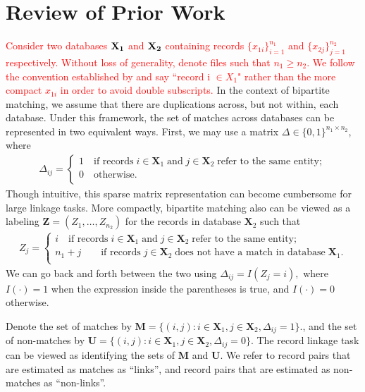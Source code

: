 \documentclass[ba]{imsart}
\begin{document}
\section{Review of Prior Work}
\label{sec:review-of_prior-work}

\textcolor{red}{Consider two databases $\bf{X}_1$ and $\bf{X}_2$ containing records $\{x_{1i}\}_{i=1}^{n_1}$ and $\{x_{2j}\}_{j=1}^{n_2}$ respectively. Without loss of generality, denote files such that $n_1 \geq n_2$. We follow the convention established by \cite{sadinle_bayesian_2017} and say ``record i $\in X_1$" rather than the more compact $x_{1i}$ in order to avoid double subscripts.} In the context of bipartite matching, we assume that there are duplications across, but not within, each database. Under this framework, the set of matches across databases can be represented in two equivalent ways. First, we may use a matrix $\Delta \in \{0, 1\}^{n_1 \times n_2}$, where
\begin{align}
	\Delta_{ij} =
	\begin{cases}
		1 \quad \text{if records}\;  i \in \bm{X}_1 \; \text{and}\; j\in \bm{X}_2 \; \text{refer to the same entity}; \\
		0 \quad \text{otherwise}.\\
	\end{cases}
\end{align}
Though intuitive, this sparse matrix representation can become cumbersome for large linkage tasks. More compactly, bipartite matching also can be viewed as a labeling $\bm{Z} = (Z_1, \ldots, Z_{n_2})$ for the records in database $\bm{X}_2$ such that 
\begin{align}
	Z_{j} =
	\begin{cases}
		i \quad \text{if records}\;  i \in \bm{X}_1 \; \text{and}\; j\in \bm{X}_2 \; \text{refer to the same entity}; \\
		n_1 + j \quad  \quad \text{if records}\;  j \in \bm{X}_2 \; \text{does not have a match in database}\; \bm{X}_1. \\
	\end{cases}
\end{align}
We can go back and forth between the two using $\Delta_{ij} = I(Z_j = i),$ where $I(\cdot) = 1$ when the expression inside the parentheses is true, and $I(\cdot) = 0$ otherwise. 

Denote the set of matches by $\bm{M} = \{(i,j): i \in \bm{X}_1, j \in \bm{X}_2, \Delta_{ij} = 1\}.$, and the set of non-matches by 
$\bm{U} =  \{(i,j): i \in \bm{X}_1, j \in \bm{X}_2, \Delta_{ij} = 0\}.$ The record linkage task can be viewed as identifying the sets of  $\bm{M}$ and  $\bm{U}.$ We refer to record pairs that are estimated as matches as ``links'', and record pairs that are estimated as non-matches as ``non-links''.
\end{document}
